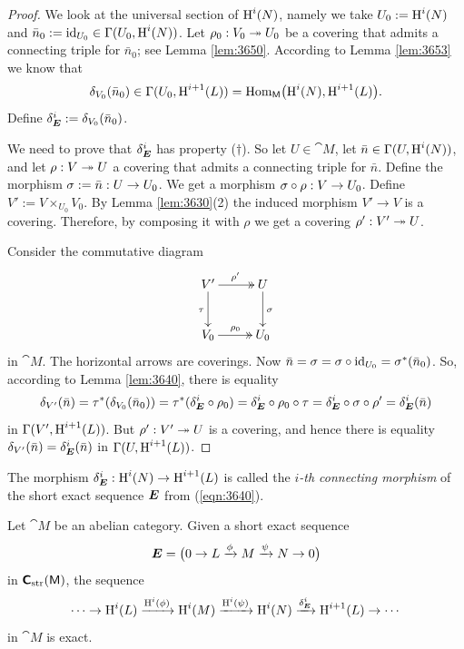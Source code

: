 \begin{proof}
We look at the universal section of $\operatorname{H}^{i}(N)$, namely we take 
$U_0 := \operatorname{H}^{i}(N)$ and 
$\bar{n}_0 := \operatorname{id}_{U_0} \in \Gamma(U_0, \operatorname{H}^i(N))$.
Let $\rho_0 : V_0 \twoheadrightarrow U_0$ be a covering that admits a connecting triple for 
$\bar{n}_0$; see Lemma \ref{lem:3650}. According to Lemma \ref{lem:3653} we 
know that 
\[ \delta_{V_0}(\bar{n}_0) \in \Gamma(U_0, \operatorname{H}^{i + 1}(L)) =
\operatorname{Hom}_{\operatorname{\mathsf{M}}} \bigl( \operatorname{H}^i(N), \operatorname{H}^{i + 1}(L) \bigr) . \]
Define 
$\delta_{\boldsymbol{E}}^i := \delta_{V_0}(\bar{n}_0)$.

We need to prove that $\delta_{\boldsymbol{E}}^i$ has property ($\dag$). 
So let $U \in \cat{M}$, let $\bar{n} \in \Gamma(U, \operatorname{H}^i(N))$, and let
$\rho : V \twoheadrightarrow U$ a covering that admits a connecting triple for $\bar{n}$.
Define the morphism $\sigma := \bar{n} : U \to U_0$. 
We get a morphism 
$\sigma \circ \rho : V \to U_0$. 
Define $V' := V \times_{U_0} V_0$. By Lemma \ref{lem:3630}(2) the induced 
morphism $V' \to V$ is a covering. Therefore, by composing it with $\rho$  we 
get a covering $\rho' : V' \twoheadrightarrow U$. 

Consider the commutative diagram 
\[ \UseTips \xymatrix @C=6ex @R=6ex {
V'
\ar@{->>}[r]^{\rho'}
\ar[d]_{\tau}
&
U
\ar[d]^{\si}
\\
V_0
\ar@{->>}[r]^{\rho_0}
&
U_0
} \]
in $\cat{M}$. The horizontal arrows are coverings. Now 
$\bar{n} = \sigma = \sigma \circ \operatorname{id}_{U_0} = \sigma^*(\bar{n}_0)$.
So, according to Lemma \ref{lem:3640}, there is equality
\[ \delta_{V'}(\bar{n}) = \tau^*(\delta_{V_0}(\bar{n}_0)) =
\tau^*(\delta_{\boldsymbol{E}}^i \circ \rho_0) = 
\delta_{\boldsymbol{E}}^i \circ \rho_0 \circ \tau = 
\delta_{\boldsymbol{E}}^i \circ \sigma \circ \rho' = \delta_{\boldsymbol{E}}^i(\bar{n}) \]
in $\Gamma(V', \operatorname{H}^{i + 1}(L))$. 
But $\rho' : V' \twoheadrightarrow U$ is a covering, and hence there is equality 
$\delta_{V'}(\bar{n}) = \delta_{\boldsymbol{E}}^i(\bar{n})$
in $\Gamma(U, \operatorname{H}^{i + 1}(L))$.
\end{proof}

\begin{dfn} \label{dfn:3640}
The morphism 
$\delta_{\boldsymbol{E}}^i : \operatorname{H}^{i}(N) \to \operatorname{H}^{i + 1}(L)$
is called the {\em $i$-th connecting morphism}
 of the short exact sequence
$\boldsymbol{E}$ from (\ref{eqn:3640}). 
\end{dfn}

\begin{thm} \label{thm:3640}
Let $\cat{M}$ be an abelian category. 
Given a short exact sequence 
\[ \boldsymbol{E} = \bigl( 0 \to L \xrightarrow{\phi} M \xrightarrow{\psi} N \to 0 \bigr) \]
in $\boldsymbol{\mathsf{C}}_{\mathrm{str}}(\operatorname{\mathsf{M}})$, 
the sequence 
\[ \cdots \to \operatorname{H}^{i}(L) \xrightarrow{\operatorname{H}^{i}(\phi)}
\operatorname{H}^{i}(M) \xrightarrow{\operatorname{H}^{i}(\psi)}
\operatorname{H}^{i}(N) \xrightarrow{\delta_{\boldsymbol{E}}^i} \operatorname{H}^{i + 1}(L) \to \cdots \]
in $\cat{M}$ is exact. 
\end{thm}

